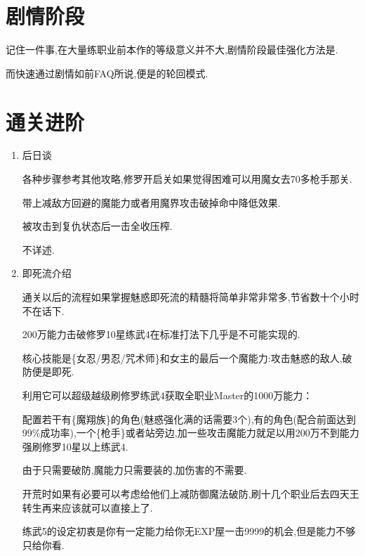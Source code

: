 \newpage

\section{剧情阶段}

记住一件事,在大量练职业前本作的等级意义并不大,剧情阶段最佳强化方法是{\color{red}{捕获+榨取+嗑药}}.

而快速通过剧情如前FAQ所说,便是{\color{red}{魔女+buff+(一触即发)+奥义捕捉+压榨+嗑药}}的轮回模式.

\newpage

\section{通关进阶}

\begin{enumerate}

	\item{后日谈}

	各种步骤参考其他攻略,修罗开启关如果觉得困难可以用魔女去70多枪手那关.

	带上减敌方回避的魔能力或者用魔界攻击破掉命中降低效果.

	被攻击到复仇状态后一击全收压榨.

	不详述.

	\item{即死流介绍}

	通关以后的流程如果掌握魅惑即死流的精髓将简单非常非常多,节省数十个小时不在话下.

	200万能力击破修罗10星练武4在标准打法下几乎是不可能实现的.

	核心技能是{\color{red}{魅惑魔法}}\{女忍/男忍/咒术师\}和女主的最后一个魔能力{\color{red}{生杀予夺}}:攻击魅惑的敌人,破防便是即死.

	利用它可以超级越级刷修罗练武4获取全职业Master的1000万能力：

	配置若干有{\color{red}{瘴气蔓延}}\{魔翔族\}的角色(魅惑强化满的话需要3个),有{\color{red}{强化9/范围9/魅惑}}的角色(配合前面达到99\%成功率),一个{\color{red}{辅助}}\{枪手\}或者{\color{red}{克里斯多}}站旁边,加一些攻击魔能力就足以用200万不到能力强刷修罗10星以上练武4.

	由于只需要破防,魔能力只需要装{\color{red}{加数值加攻击}}的,加伤害的不需要.

	开荒时如果有必要可以考虑给他们上减防御魔法破防,刷十几个职业后去四天王转生再来应该就可以直接上了.

	练武5的设定初衷是你有一定能力给你无EXP屋一击9999的机会,但是能力不够只给你看.


\end{enumerate}

